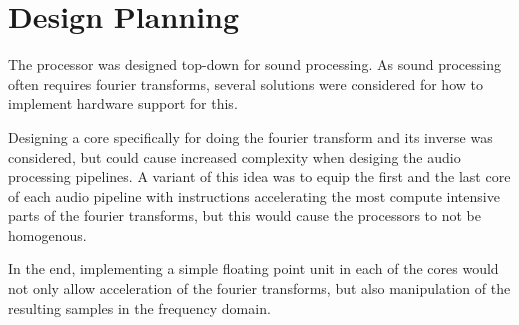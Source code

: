 \FloatBarrier

\section{Design Planning}\label{sec:fpga-design}

The processor was designed top-down for sound processing. As sound processing
often requires fourier transforms, several solutions were considered for how
to implement hardware support for this.

Designing a core specifically for doing the fourier transform and its inverse
was considered, but could cause increased complexity when desiging the
audio processing pipelines. A variant of this idea was to equip the first
and the last core of each audio pipeline with instructions accelerating
the most compute intensive parts of the fourier transforms, but this
would cause the processors to not be homogenous.

In the end, implementing a simple floating point unit in each of the cores
would not only allow acceleration of the fourier transforms, but also manipulation
of the resulting samples in the frequency domain.

